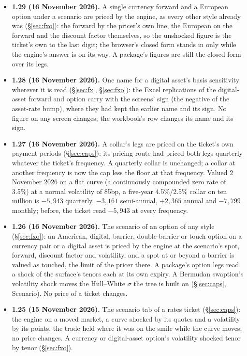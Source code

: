 \documentclass[11pt,a4paper]{article}
\newcommand{\code}[1]{\ifmmode\text{\small\texttt{\detokenize{#1}}}\else{\small\path{#1}}\fi}
\begin{document}
{\begin{itemize}[leftmargin=1.4em, itemsep=4pt]
\item \textbf{1.29 (16 November 2026).} A single currency forward and a European option under a scenario are priced by the engine, as every other style already was (\S\ref{sec:fxo}): the forward by the pricer's own line, the European on the forward and the discount factor themselves, so the unshocked figure is the ticket's own to the last digit; the browser's closed form stands in only while the engine's answer is on its way. A package's figures are still the closed form over its legs.
\item \textbf{1.28 (16 November 2026).} One name for a digital asset's basis sensitivity wherever it is read (\S\ref{sec:fx}, \S\ref{sec:fxo}): the Excel replications of the digital-asset forward and option carry \code{CRYBASIS01} with the screens' sign (the negative of the asset-rate bump), where they had kept the earlier name \code{FUND01} and its sign. No figure on any screen changes; the workbook's row changes its name and its sign.
\item \textbf{1.27 (16 November 2026).} A collar's legs are priced on the ticket's own payment periods (\S\ref{sec:caps}): its pricing route had priced both legs quarterly whatever the ticket's frequency. A quarterly collar is unchanged; a collar at another frequency is now the cap less the floor at that frequency. Valued 2 November 2026 on a flat curve (a continuously compounded zero rate of 3.5\%) at a normal volatility of 85bp, a five-year 4.5\%/2.5\% collar on ten million is $-5{,}943$ quarterly, $-3{,}161$ semi-annual, $+2{,}365$ annual and $-7{,}799$ monthly; before, the ticket read $-5{,}943$ at every frequency.
\item \textbf{1.26 (16 November 2026).} The scenario of an option of any style (\S\ref{sec:fxo}): an American, digital, barrier, double-barrier or touch option on a currency pair or a digital asset is priced by the engine at the scenario's spot, forward, discount factor and volatility, and a spot at or beyond a barrier is valued as touched, the limit of the pricer there. A package's option legs read a shock of the surface's tenors each at its own expiry. A Bermudan swaption's volatility shock moves the Hull--White $\sigma$ the tree is built on (\S\ref{sec:caps}, Scenario). No price of a ticket changes.
\item \textbf{1.25 (15 November 2026).} The scenario tab of a rates ticket (\S\ref{sec:caps}): the engine on a moved market, a curve shocked by its quotes and a volatility by its points, the trade held where it was on the smile while the curve moves; no price changes. A currency or digital-asset option's volatility shocked tenor by tenor (\S\ref{sec:fxo}).

\end{itemize}}
\end{document}
